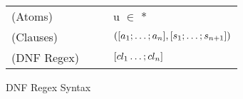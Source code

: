 \documentclass{article}
\begin{document}
\begin{figure}
\begin{tabular}{l@{\ }l@{\ }c@{\ }l}

(Atoms)& \Atom{} & \GEq{} & u $\in$ \TypeContext{} \GBar{} \DNFRegex{}* \\
(Clauses)& \Clause{} & \GEq{} &
$([a_1 ; \ldots ; a_n], [s_1 ; \ldots ; s_{n+1}])$ \\
(DNF Regex)& \DNFRegex{} & \GEq{} & $[cl_1 \ldots ; cl_n]$ \\
\end{tabular}
\caption{DNF Regex Syntax}
\label{fig:refn-subgrammars}
\end{figure}
\end{document}
